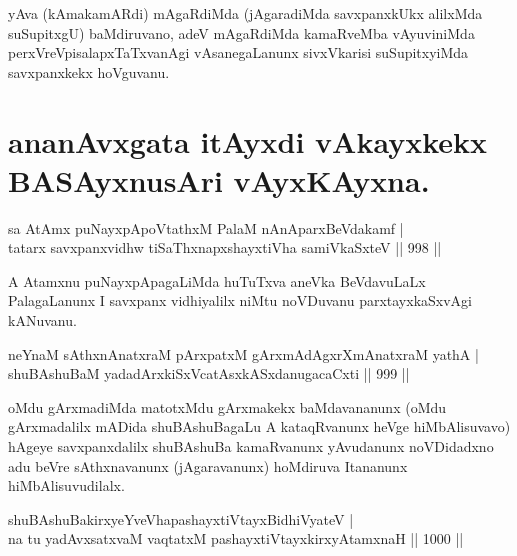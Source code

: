\begin{artha}
yAva (kAmakamARdi) mAgaRdiMda (jAgaradiMda savxpanxkUkx alilxMda suSupitxgU) baMdiruvano, adeV mAgaRdiMda kamaRveMba vAyuviniMda perxVreVpisalapxTaTxvanAgi vAsanegaLanunx sivxVkarisi suSupitxyiMda savxpanxkekx hoVguvanu.
\end{artha}

\section*{ananAvxgata itAyxdi vAkayxkekx BASAyxnusAri vAyxKAyxna.}


\begin{shl}
sa AtAmx puNayxpApoVtathxM PalaM nAnAparxBeVdakamf | \\
tatarx savxpanxvidhw tiSaThxnapxshayxtiVha samiVkaSxteV \hfill||  998 || 
\end{shl}

\begin{artha}
A Atamxnu puNayxpApagaLiMda huTuTxva aneVka BeVdavuLaLx PalagaLanunx I savxpanx vidhiyalilx niMtu noVDuvanu parxtayxkaSxvAgi kANuvanu.
\end{artha}


\begin{shl}
neYnaM sAthxnAnatxraM pArxpatxM gArxmAdAgxrXmAnatxraM yathA | \\
shuBAshuBaM yadadArxkiSxVcatAsxkASxdanugacaCxti \hfill||  999 ||  
\end{shl}

\begin{artha}
oMdu gArxmadiMda matotxMdu gArxmakekx baMdavananunx (oMdu gArxmadalilx mADida shuBAshuBagaLu A kataqRvanunx heVge hiMbAlisuvavo) hAgeye savxpanxdalilx shuBAshuBa kamaRvanunx yAvudanunx noVDidadxno adu beVre sAthxnavanunx (jAgaravanunx) hoMdiruva Itananunx hiMbAlisuvudilalx.
\end{artha}


\begin{shl}
shuBAshuBakirxyeYveVha\footnotemark[1] pashayxtiVtayxBidhiVyateV | \\
na tu yadAvxsatxvaM vaqtatxM pashayxtiVtayxkirxyAtamxnaH \hfill||  1000 ||  
\end{shl}

